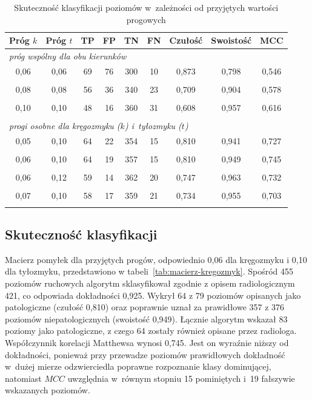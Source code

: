 \begin{table}[H]
    \centering
    \captionsetup{justification=centering, font=small}
    \caption{Skuteczność klasyfikacji poziomów w~zależności od przyjętych wartości progowych}
    \label{tab:progi-kregozmyk}
    \small
    \begin{tabular}{ccccccccc}
        \hline
        \textbf{Próg $k$} & \textbf{Próg $t$} & \textbf{TP} & \textbf{FP} & \textbf{TN} & \textbf{FN} & \textbf{Czułość} & \textbf{Swoistość} & \textbf{MCC} \\
        \hline
        \multicolumn{9}{l}{\textit{próg wspólny dla obu kierunków}} \\
        0,06 & 0,06 & 69 & 76 & 300 & 10 & 0,873 & 0,798 & 0,546 \\\\
        0,08 & 0,08 & 56 & 36 & 340 & 23 & 0,709 & 0,904 & 0,578 \\\\
        0,10 & 0,10 & 48 & 16 & 360 & 31 & 0,608 & 0,957 & 0,616 \\\\
        \hline
        \multicolumn{9}{l}{\textit{progi osobne dla kręgozmyku ($k$) i~tyłozmyku ($t$)}} \\
        0,05 & 0,10 & 64 & 22 & 354 & 15 & 0,810 & 0,941 & 0,727 \\\\
        0,06 & 0,10 & 64 & 19 & 357 & 15 & 0,810 & 0,949 & 0,745 \\\\
        0,06 & 0,12 & 59 & 14 & 362 & 20 & 0,747 & 0,963 & 0,732 \\\\
        0,07 & 0,10 & 58 & 17 & 359 & 21 & 0,734 & 0,955 & 0,703 \\\\
        \hline
    \end{tabular}
\end{table}

\subsection{Skuteczność klasyfikacji}
\label{subsec:skutecznosc-kregozmyk}

Macierz pomyłek dla przyjętych progów, odpowiednio 0,06 dla kręgozmyku i 0,10 dla tyłozmyku, przedstawiono w tabeli~\ref{tab:macierz-kregozmyk}.
Spośród 455 poziomów ruchowych algorytm sklasyfikował zgodnie z opisem radiologicznym 421, co odpowiada dokładności 0,925.
Wykrył 64 z 79 poziomów opisanych jako patologiczne (czułość 0,810) oraz poprawnie uznał za prawidłowe 357 z 376 poziomów niepatologicznych (swoistość 0,949).
Łącznie algorytm wskazał 83 poziomy jako patologiczne, z czego 64 zostały również opisane przez radiologa.
Współczynnik korelacji Matthewsa wynosi 0,745. Jest on wyraźnie niższy od dokładności, ponieważ przy przewadze poziomów prawidłowych dokładność w~dużej mierze odzwierciedla poprawne rozpoznanie klasy dominującej, natomiast $MCC$ uwzględnia w~równym stopniu 15 pominiętych i~19 fałszywie wskazanych poziomów.

